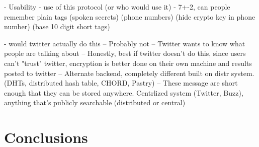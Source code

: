 \documentclass{acm_proc_article-sp}
\begin{document}
- Usability
	- use of this protocol (or who would use it)
	- 7+-2, can people remember plain tags (spoken secrets) (phone numbers) (hide crypto key in phone number) (base 10 digit short tags)
	
- would twitter actually do this
	-- Probably not
	-- Twitter wants to know what people are talking about
	-- Honestly, best if twitter doesn't do this, since users can't "trust" twitter, encryption is better done on their own machine and results posted to twitter
		-- Alternate backend, completely different built on distr system. (DHTs, distributed hash table, CHORD, Pastry)
		-- These message are short enough that they can be stored anywhere. Centrlized system (Twitter, Buzz), anything that's publicly searchable (distributed or central)


\section{Conclusions}






\balancecolumns
\end{document}
